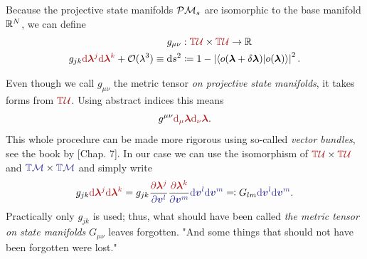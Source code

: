 \begin{definition}
    \label{def:metricTensor}

Because the projective state manifolds $\mathcal{P}\mathcal{M}_s$ are isomorphic to the base manifold $\mathbb{R}^N$, we can define
    \begin{equation}
        \begin{split}
            g_{\mu\nu}&: \redd{\T\mathcal U}\times \redd{\T\mathcal U}\rightarrow \R \\
            g_{jk}\redd{\d \bm \lambda^j \d\bm \lambda^k}+\O(\lambda^3) \equiv \d s^2 &\coloneqq 1-\left|\braket{o(\bm\llambda+\delta\bm\llambda)|o(\bm\llambda)}\right|^2.
            \label{eq:metricTensorDef}
        \end{split}
    \end{equation} 
   
\end{definition}
Even though we call $g_{\mu\nu}$ the metric tensor \emph{on projective state manifolds}, it takes forms from $\redd{\T\mathcal U}$. Using abstract indices this means
\begin{equation}
    g^{\mu\nu}\redd{\d_\mu \llambda \d_\nu \llambda}.
\end{equation}
This whole procedure can be made more rigorous using so-called \emph{vector bundles}, see the book by \citet{lu}[Chap. 7]. In our case we can use the isomorphism of $\redd{\T\mathcal U}\times \redd{\T\mathcal U}$ and $\bluee{\T\M}\times \bluee{\T\M}$ and simply write
\begin{equation}
    g_{jk}\redd{\d\llambda^j \d\llambda^k} = g_{jk}\frac{\redd{\partial\llambda^j}}{\bluee{\partial\bm v^l}}\frac{\redd{\partial\llambda^k}}{\bluee{\partial\bm v^m}} \bluee{\d\bm v^l \d \bm v^m} \eqqcolon G_{lm}\bluee{\d\bm v^l \d \bm v^m}.
\end{equation}
Practically only $g_{jk}$ is used; thus, what should have been called \emph{the metric tensor on state manifolds} $G_{\mu\nu}$ leaves forgotten. "And some things that should not have been forgotten were lost." \citet{lordOfTheRings}







